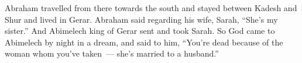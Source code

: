 
\begin{inparaenum}
     Abraham travelled from there towards the south and stayed between Kadesh and Shur and lived in Gerar.%
     Abraham said regarding his wife, Sarah, ``She's my sister.'' And Abimelech king of Gerar sent and took Sarah.%
     So God came to Abimelech by night in a dream, and said to him, ``You're dead because of the woman whom you've taken~--- she's married to a husband.''%
\end{inparaenum}
